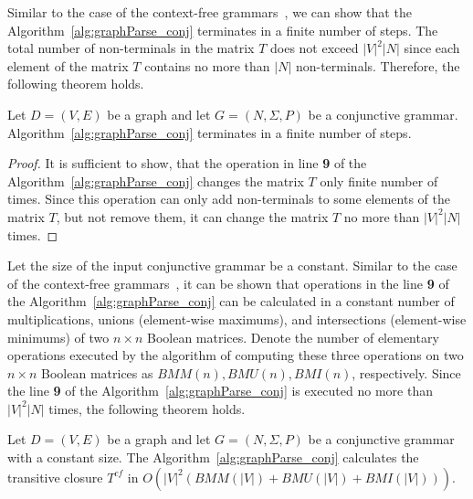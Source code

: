 Similar to the case of the context-free grammars~\cite{azimov2018context}, we can show that the Algorithm~\ref{alg:graphParse_conj} terminates in a finite number of steps. The total number of non-terminals in the matrix $T$ does not exceed $|V|^2|N|$ since each element of the matrix $T$ contains no more than $|N|$ non-terminals. Therefore, the following theorem holds.

\begin{mytheorem}\label{thm:finite_conj}
    Let $D = (V,E)$ be a graph and let $G =(N,\Sigma,P)$ be a conjunctive grammar. Algorithm~\ref{alg:graphParse_conj} terminates in a finite number of steps. 
\end{mytheorem}
\begin{proof}
    It is sufficient to show, that the operation in line \textbf{9} of the Algorithm~\ref{alg:graphParse_conj} changes the matrix $T$ only finite number of times. Since this operation can only add non-terminals to some elements of the matrix $T$, but not remove them, it can change the matrix $T$ no more than $|V|^2|N|$ times.
\end{proof}

Let the size of the input conjunctive grammar be a constant. Similar to the case of the context-free grammars~\cite{azimov2018context}, it can be shown that operations in the line \textbf{9} of the Algorithm~\ref{alg:graphParse_conj} can be calculated in a constant number of multiplications, unions (element-wise maximums), and intersections (element-wise minimums) of two $n \times n$ Boolean matrices. Denote the number of elementary operations executed by the algorithm of computing these three operations on two $n \times n$ Boolean matrices as $BMM(n), BMU(n), BMI(n)$, respectively. Since the line \textbf{9} of the Algorithm~\ref{alg:graphParse_conj} is executed no more than $|V|^2|N|$ times, the following theorem holds.

\begin{mytheorem}\label{thm:time_conj}
    Let $D = (V,E)$ be a graph and let $G =(N,\Sigma,P)$ be a conjunctive grammar with a constant size. The Algorithm~\ref{alg:graphParse_conj} calculates the transitive closure $T^{cf}$ in $O(|V|^2(BMM(|V|) + BMU(|V|) + BMI(|V|)))$.
\end{mytheorem}

